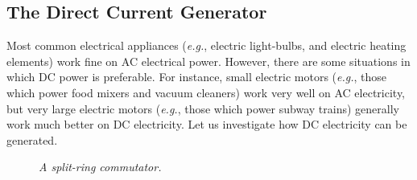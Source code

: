 \subsection{The Direct Current Generator}
Most common electrical appliances ({\em e.g.}, electric light-bulbs, and electric
heating elements) work fine on AC electrical power. However, there are some
situations in which DC  power is preferable. For instance, small electric
motors ({\em e.g.}, those which power food mixers and vacuum cleaners) work very well on AC
electricity, but very large electric motors ({\em e.g.}, those
which power subway trains) generally work much better on DC electricity. Let us
investigate how DC electricity can be generated. 

\begin{figure}
\epsfysize=2.5in
\centerline{}
\caption{\em A split-ring commutator.}\label{f9.8}
\end{figure}

